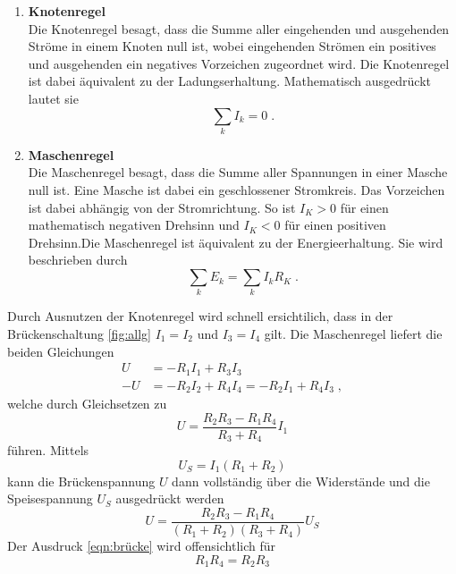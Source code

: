 \begin{enumerate}
    \item\textbf{Knotenregel}
    \\\noindent
    Die Knotenregel besagt, dass die Summe aller eingehenden und ausgehenden Ströme in einem Knoten null ist, wobei eingehenden Strömen 
    ein positives und ausgehenden ein negatives Vorzeichen zugeordnet wird. Die Knotenregel ist dabei äquivalent zu der Ladungserhaltung.
    Mathematisch ausgedrückt lautet sie
    \begin{equation}
        \sum_k I_k=0 \;.
        \label{eqn:kirchhoff1}
    \end{equation}

    \item\textbf{Maschenregel}
    \\\noindent
    Die Maschenregel besagt, dass die Summe aller Spannungen in einer Masche null ist. Eine Masche ist dabei ein geschlossener Stromkreis. 
    Das Vorzeichen ist dabei abhängig von der Stromrichtung. So ist $I_K>0$ für einen mathematisch negativen Drehsinn und $I_K<0$ für einen
    positiven Drehsinn.Die Maschenregel ist äquivalent zu der Energieerhaltung. Sie wird beschrieben durch
    \begin{equation}
        \sum_k E_k=\sum_k I_k R_K \;.
        \label{eqn:kirchhoff2}
    \end{equation}
\end{enumerate}
Durch Ausnutzen der Knotenregel wird schnell ersichtilich, dass in der Brückenschaltung \ref{fig:allg} $I_1=I_2$ und $I_3=I_4$ gilt. 
Die Maschenregel liefert die beiden Gleichungen 
\begin{align*}
    U &=-R_1I_1 + R_3I_3\\
    -U&=-R_2I_2 + R_4I_4 = -R_2I_1+R_4I_3 \;,
\end{align*}
welche durch Gleichsetzen zu 
\begin{equation*}
    U=\frac{R_2R_3-R_1R_4}{R_3+R_4}I_1
\end{equation*}
führen. Mittels 
\begin{equation*}
    U_S=I_1(R_1+R_2)
\end{equation*}
kann die Brückenspannung $U$ dann vollständig über die Widerstände und die Speisespannung $U_S$ ausgedrückt werden 
\begin{equation}
    U=\frac{R_2R_3-R_1R_4}{(R_1+R_2)(R_3+R_4)}U_S
    \label{eqn:brücke}
\end{equation}
Der Ausdruck \eqref{eqn:brücke} wird offensichtlich für 
\begin{equation}
    R_1R_4=R_2R_3
    \label{eqn:abgleich} 
\end{equation}
